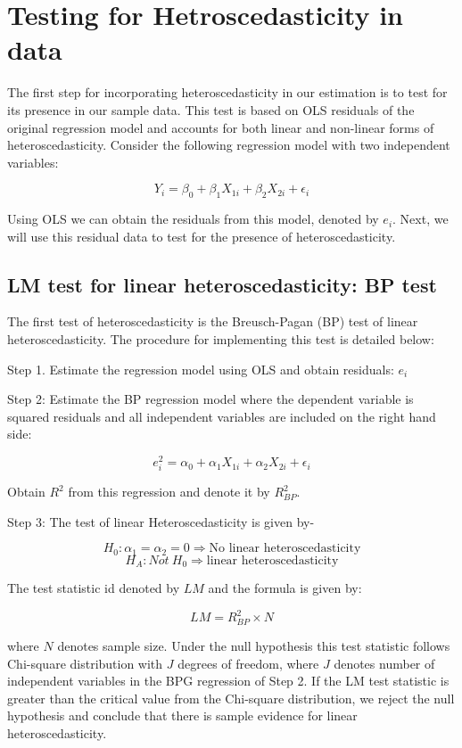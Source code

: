 \documentclass[
]{book}
\theoremstyle{definition}
\theoremstyle{definition}
\theoremstyle{definition}
\theoremstyle{definition}
\theoremstyle{remark}
\begin{document}
\hypertarget{testing-for-hetroscedasticity-in-data}{%
\section{Testing for Hetroscedasticity in data}\label{testing-for-hetroscedasticity-in-data}}

The first step for incorporating heteroscedasticity in our estimation is to test for its presence in our sample data. This test is based on OLS residuals of the original regression model and accounts for both linear and non-linear forms of heteroscedasticity. Consider the following regression model with two independent variables:

\[Y_i=\beta_0 + \beta_1 X_{1i} + \beta_2 X_{2i} + \epsilon_i\]

Using OLS we can obtain the residuals from this model, denoted by \(e_i\). Next, we will use this residual data to test for the presence of heteroscedasticity.

\hypertarget{lm-test-for-linear-heteroscedasticity-bp-test}{%
\subsection{LM test for linear heteroscedasticity: BP test}\label{lm-test-for-linear-heteroscedasticity-bp-test}}

The first test of heteroscedasticity is the Breusch-Pagan (BP) test of linear heteroscedasticity. The procedure for implementing this test is detailed below:

Step 1. Estimate the regression model using OLS and obtain residuals: \(e_i\)

Step 2: Estimate the BP regression model where the dependent variable is squared residuals and all independent variables are included on the right hand side:

\[e^2_i=\alpha_0 + \alpha_1 X_{1i} + \alpha_2 X_{2i} + \epsilon_i\]

Obtain \(R^2\) from this regression and denote it by \(R^2_{BP}\).

Step 3: The test of linear Heteroscedasticity is given by-

\[H_0: \alpha_1=\alpha_2=0 \Rightarrow \text{No linear heteroscedasticity}\]
\[H_A: Not \  H_0 \Rightarrow \text{linear heteroscedasticity}\]

The test statistic id denoted by \(LM\) and the formula is given by:

\[LM=R^2_{BP} \times N\]

where \(N\) denotes sample size. Under the null hypothesis this test statistic follows Chi-square distribution with \(J\) degrees of freedom, where \(J\) denotes number of independent variables in the BPG regression of Step 2. If the LM test statistic is greater than the critical value from the Chi-square distribution, we reject the null hypothesis and conclude that there is sample evidence for linear heteroscedasticity.
\end{document}
